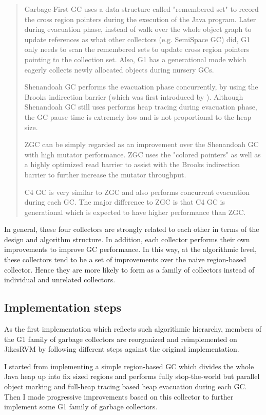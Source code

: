 \begin{quote}
  Garbage-First GC uses a data structure called "remembered set" to record the
  cross region pointers during the execution of the Java program.
  Later during evacuation phase, instead of walk over the whole object graph to update
  references as what other collectors (e.g. SemiSpace GC) did, G1 only needs to scan the
  remembered sets to update cross region pointers pointing to the collection set.
  Also, G1 has a generational mode which eagerly collects newly allocated objects
  during nursery GCs.

  Shenandoah GC performs the evacuation phase concurrently, by using the
  Brooks indirection barrier (which was first introduced by \cite{brooks1984trading}).
  Although Shenandoah GC still uses performs heap tracing during evacuation phase,
  the GC pause time is extremely low and is not proportional to the heap size.

  ZGC can be simply regarded as an improvement over the Shenandoah GC with high mutator performance.
  ZGC uses the "colored pointers"
  as well as a highly optimized read barrier to assist with the Brooks indirection barrier
  to further increase the mutator throughput.

  C4 GC is very similar to ZGC and also performs concurrent evacuation during each
  GC. The major difference to ZGC is that C4 GC is generational which is expected
  to have higher performance than ZGC.
\end{quote}

In general, these four collectors are strongly related to each other in terms of
the design and algorithm structure. In addition, each collector performs their
own improvements to improve GC performance. In this way, at the algorithmic level,
these collectors tend to be a set of improvements over the naive region-based collector.
Hence they are more likely to form as a family of collectors
instead of individual and unrelated collectors.

\subsection{Implementation steps}

As the first implementation which reflects such algorithmic hierarchy,
members of the G1 family of garbage collectors are reorganized and reimplemented on JikesRVM
by following different steps against the original implementation. 

I started from implementing a simple region-based GC which divides the whole Java heap
up into fix sized regions and performs fully stop-the-world but parallel object marking
and full-heap tracing based heap evacuation during each GC.
Then I made progressive improvements based on this collector to further implement some G1 family of garbage collectors.

